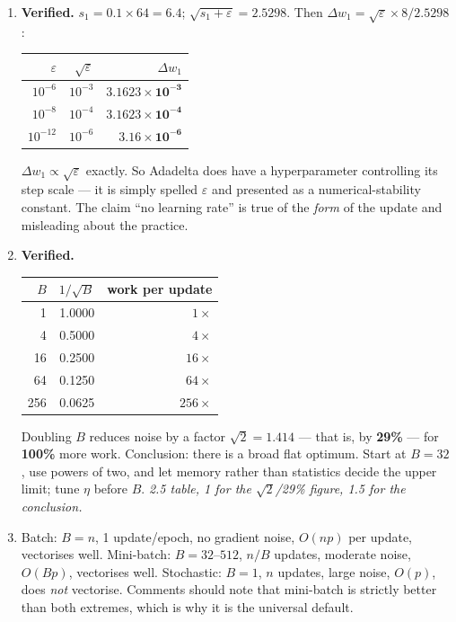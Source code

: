 \documentclass[11pt,a4paper]{article}
\newcommand{\A}[1]{\item[\textbf{#1}]}
\begin{document}
\begin{enumerate}[leftmargin=1.9cm]
\A{U3.36} \textbf{Verified.} $s_1 = 0.1 \times 64 = 6.4$; $\sqrt{s_1 + \varepsilon}
= 2.5298$. Then $\Delta w_1 = \sqrt\varepsilon \times 8 / 2.5298$:
\begin{center}\begin{tabular}{@{}rrr@{}}\toprule
$\varepsilon$ & $\sqrt\varepsilon$ & $\Delta w_1$\\
\midrule
$10^{-6}$ & $10^{-3}$ & $\mathbf{3.1623\times10^{-3}}$\\
$10^{-8}$ & $10^{-4}$ & $\mathbf{3.1623\times10^{-4}}$\\
$10^{-12}$ & $10^{-6}$ & $\mathbf{3.16\times10^{-6}}$\\
\bottomrule\end{tabular}\end{center}
$\Delta w_1 \propto \sqrt\varepsilon$ exactly. So Adadelta does have a
hyperparameter controlling its step scale --- it is simply spelled
$\varepsilon$ and presented as a numerical-stability constant. The claim ``no
learning rate'' is true of the \emph{form} of the update and misleading about
the practice.

\A{U3.37} \textbf{Verified.}
\begin{center}\begin{tabular}{@{}rrr@{}}\toprule
$B$ & $1/\sqrt B$ & work per update\\
\midrule
1 & 1.0000 & $1\times$\\ 4 & 0.5000 & $4\times$\\ 16 & 0.2500 & $16\times$\\
64 & 0.1250 & $64\times$\\ 256 & 0.0625 & $256\times$\\
\bottomrule\end{tabular}\end{center}
Doubling $B$ reduces noise by a factor $\sqrt2 = 1.414$ --- that is, by
\textbf{29\%} --- for \textbf{100\%} more work. Conclusion: there is a broad
flat optimum. Start at $B = 32$, use powers of two, and let memory rather than
statistics decide the upper limit; tune $\eta$ before $B$.
\emph{2.5 table, 1 for the $\sqrt2$/29\% figure, 1.5 for the conclusion.}

\A{U3.38} Batch: $B = n$, 1 update/epoch, no gradient noise, $O(np)$ per
update, vectorises well. Mini-batch: $B = 32$--$512$, $n/B$ updates, moderate
noise, $O(Bp)$, vectorises well. Stochastic: $B = 1$, $n$ updates, large noise,
$O(p)$, does \emph{not} vectorise. Comments should note that mini-batch is
strictly better than both extremes, which is why it is the universal default.


\end{enumerate}
\end{document}
